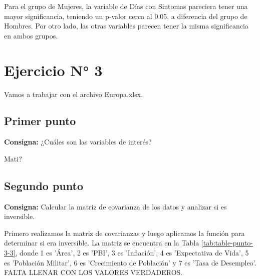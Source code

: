 \documentclass{article} %
\begin{document}
Para el grupo de Mujeres, la variable de Días con Sintomas pareciera tener una mayor significancia, teniendo un p-valor cerca al 0.05, a diferencia del grupo de Hombres. Por otro lado, las otras variables parecen tener la misma significancia en ambos grupos. 


\section{Ejercicio N° 3}

Vamos a trabajar con el archivo Europa.xlsx.

\subsection{Primer punto}

\textbf{Consigna:} ¿Cuáles son las variables de interés?

Mati?

\subsection{Segundo punto}

\textbf{Consigna:} Calcular la matriz de covarianza de los datos y analizar si es inversible.

Primero realizamos la matriz de covarianzas y luego aplicamos la función para determinar si era inversible. La matriz se encuentra en la Tabla \ref{tab:table-punto-3-3}, donde 1 es 'Área', 2 es 'PBI', 3 es 'Inflación', 4 es 'Expectativa de Vida', 5 es 'Población Militar', 6 es 'Crecimiento de Población' y 7 es 'Tasa de Desempleo'. FALTA LLENAR CON LOS VALORES VERDADEROS.
\end{document}
